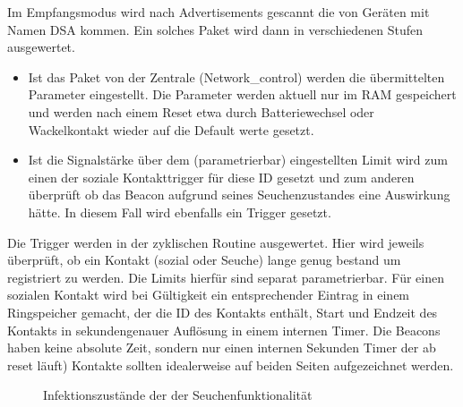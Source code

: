 \documentclass[11pt,ngerman]{scrartcl} %
\begin{document}
Im Empfangsmodus wird nach Advertisements gescannt die von Geräten mit Namen DSA kommen. Ein solches Paket wird dann in verschiedenen Stufen ausgewertet.
\begin{itemize}
\item Ist das Paket von der Zentrale (Network\_control) werden die übermittelten Parameter eingestellt. Die Parameter werden aktuell nur im RAM gespeichert und werden nach einem Reset etwa durch Batteriewechsel oder Wackelkontakt wieder auf die Default werte gesetzt. 
\item Ist die Signalstärke über dem (parametrierbar) eingestellten Limit wird zum einen der soziale Kontakttrigger für diese ID gesetzt und zum anderen überprüft ob das Beacon aufgrund seines Seuchenzustandes eine Auswirkung hätte. In diesem Fall wird ebenfalls ein Trigger gesetzt.
\end{itemize}
Die Trigger werden in der zyklischen Routine ausgewertet. Hier wird jeweils überprüft, ob ein Kontakt (sozial oder Seuche) lange genug bestand um registriert zu werden. Die Limits hierfür sind separat parametrierbar. Für einen sozialen Kontakt wird bei Gültigkeit ein entsprechender Eintrag in einem Ringspeicher gemacht, der die ID des Kontakts enthält, Start und Endzeit des Kontakts in sekundengenauer Auflösung in einem internen Timer. Die Beacons haben keine absolute Zeit, sondern nur einen internen Sekunden Timer der ab reset läuft) Kontakte sollten idealerweise auf beiden Seiten aufgezeichnet werden.

\begin{figure}[h]
\centering
{}
\caption{Infektionszustände der der Seuchenfunktionalität}
   \label{fig:statemachine}
\end{figure}
\end{document}
